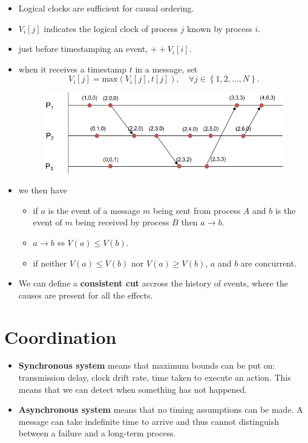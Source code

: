 \documentclass[twocolumn,landscape,10pt]{article}
\theoremstyle{definition}
\begin{document}
\begin{itemize}
    \item Logical clocks are sufficient for causal ordering.
    \item $V_i[j]$ indicates the logical clock of process $j$ known by
        process $i$.
    \item just before timestamping an event, $++V_i[i]$.
    \item when it receives a timestamp $t$ in a message, set
        \[
            V_i[j]=\text{max}(V_i[j],t[j]), 
            \quad\forall
            j\in\left\{1,2,\ldots,N\right\}.
        \]
        \begin{figure}[h]
          	\includegraphics[scale=0.35]{vector_clock.png}
          	\centering
        \end{figure}
        
    \item we then have
        \begin{itemize}
            \item if $a$ is the event of a message $m$ being sent from process
                $A$ and $b$ is the event of $m$ being received by process $B$
                then $a\rightarrow b$.
            \item $a\rightarrow b \iff V(a)\le V(b)$.
            \item if neither $V(a)\le V(b)$ nor $V(a)\ge V(b)$, $a$ and $b$ are
                concurrent.
        \end{itemize} 
    \item We can define a \textbf{consistent cut} accross the history of events, 
        where the causes are present for all the effects.
\end{itemize} 


\section{Coordination}

\begin{itemize}
    \item \textbf{Synchronous system} means that maximum bounds can be put on:
        transmission delay, clock drift rate, time taken to execute an action.
        This means that we can detect when something has not happened.
    \item \textbf{Asynchronous system} means that no timing assumptions can be
        made. A message can take indefinite time to arrive and thus cannot
        distinguish between a failure and a long-term process.
\end{itemize} 
\end{document}
